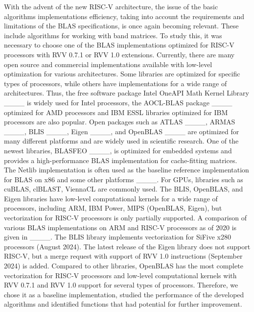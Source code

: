 With the advent of the new RISC-V architecture, the issue of the basic algorithms implementations efficiency, taking into account the requirements and limitations of the BLAS specifications, is once again becoming relevant. These include algorithms for working with band matrices. To study this, it was necessary to choose one of the BLAS implementations optimized for RISC-V processors with RVV 0.7.1 or RVV 1.0 extensions. Currently, there are many open source and commercial implementations available with low-level optimization for various architectures. Some libraries are optimized for specific types of processors, while others have implementations for a wide range of architectures. Thus, the free software package Intel OneAPI Math Kernel Library ____ is widely used for Intel processors, the AOCL-BLAS package ____ optimized for AMD processors and IBM ESSL libraries optimized for IBM processors are also popular. Open packages such as ATLAS ____, ARMAS ____, BLIS ____, Eigen ____, and OpenBLAS ____ are optimized for many different platforms and are widely used in scientific research. One of the newest libraries, BLASFEO ____, is optimized for embedded systems and provides a high-performance BLAS implementation for cache-fitting matrices. The Netlib implementation is often used as the baseline reference implementation for BLAS on x86 and some other platforms ____. For GPUs, libraries such as cuBLAS, clBLAST, ViennaCL are commonly used. The BLIS, OpenBLAS, and Eigen libraries have low-level computational kernels for a wide range of processors, including ARM, IBM Power, MIPS (OpenBLAS, Eigen), but vectorization for RISC-V processors is only partially supported. A comparison of various BLAS implementations on ARM and RISC-V processors as of 2020 is given in ____. The BLIS library implements vectorization for SiFive x280 processors (August 2024). The latest release of the Eigen library does not support RISC-V, but a merge request with support of RVV 1.0 instructions (September 2024) is added. Compared to other libraries, OpenBLAS has the most complete vectorization for RISC-V processors and low-level computational kernels with RVV 0.7.1 and RVV 1.0 support for several types of processors. Therefore, we chose it as a baseline implementation, studied the performance of the developed algorithms and identified functions that had potential for further improvement.